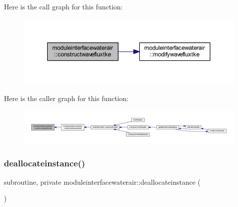 Here is the call graph for this function\+:\nopagebreak
\begin{figure}[H]
\begin{center}
\leavevmode
\includegraphics[width=350pt]{namespacemoduleinterfacewaterair_af474bb755901d845cb8a0f3efa8ffcbe_cgraph}
\end{center}
\end{figure}
Here is the caller graph for this function\+:\nopagebreak
\begin{figure}[H]
\begin{center}
\leavevmode
\includegraphics[width=350pt]{namespacemoduleinterfacewaterair_af474bb755901d845cb8a0f3efa8ffcbe_icgraph}
\end{center}
\end{figure}
\mbox{\label{namespacemoduleinterfacewaterair_ab0b32961ac4c2950c8d474148dba7b1d}} 
\subsubsection{\texorpdfstring{deallocateinstance()}{deallocateinstance()}}
{\footnotesize\ttfamily subroutine, private moduleinterfacewaterair\+::deallocateinstance (\begin{DoxyParamCaption}{ }\end{DoxyParamCaption})\hspace{0.3cm}{\ttfamily [private]}}

